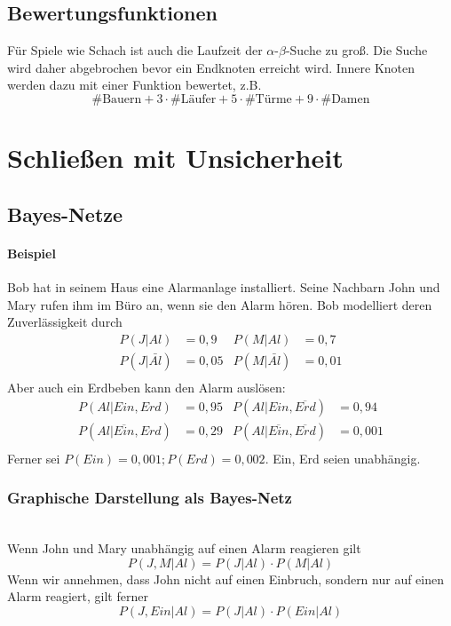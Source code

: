 \documentclass[a4paper]{scrartcl}
\begin{document}
\subsection{Bewertungsfunktionen} Für Spiele wie Schach ist auch die Laufzeit der $\alpha$-$\beta$-Suche zu groß. Die Suche wird daher abgebrochen bevor ein Endknoten erreicht wird. Innere Knoten werden dazu mit einer Funktion bewertet, z.B.
\[ \text{\# Bauern} + 3 \cdot \text{\# Läufer} + 5\cdot \text{\# Türme} + 9 \cdot \text{\# Damen} \]

\section{Schließen mit Unsicherheit}
\subsection{Bayes-Netze}
\paragraph{Beispiel} Bob hat in seinem Haus eine Alarmanlage installiert. Seine Nachbarn John und Mary rufen ihm im Büro an, wenn sie den Alarm hören. Bob modelliert deren Zuverlässigkeit durch
\begin{align*}
P(J | Al ) &= 0,9  &P(M | Al) &= 0,7 \\
P(J | \bar{Al} ) &= 0,05 &P(M | \bar{Al} ) &= 0,01\\
\end{align*}
Aber auch ein Erdbeben kann den Alarm auslösen:
\begin{align*}
P(Al | Ein,Erd) &= 0,95 &P(Al | Ein, \overline{Erd}) &= 0,94 \\
P(Al | \overline{Ein},Erd) &= 0,29 &P(Al | \overline{Ein}, \overline{Erd} ) &= 0,001\\
\end{align*}
Ferner sei $P(Ein) = 0,001; P(Erd) = 0,002$. Ein, Erd seien unabhängig.

\subsubsection{Graphische Darstellung als Bayes-Netz}
\\
Wenn John und Mary unabhängig auf einen Alarm reagieren gilt
\[ P(J,M|Al) = P(J|Al) \cdot P(M | Al) \]
Wenn wir annehmen, dass John nicht auf einen Einbruch, sondern nur auf einen Alarm reagiert, gilt ferner
\[ P(J,Ein | Al) = P(J|Al) \cdot P(Ein |Al) \]
\end{document}
